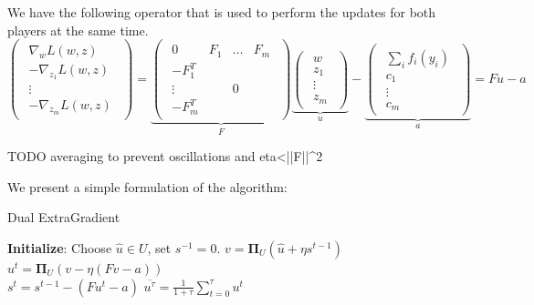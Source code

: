 We have the following operator that is used to perform the updates for
both players at the same time.
\begin{equation}
  \begin{pmatrix}
    \begin{array}{c} \nabla_{ w} {L}( w, z)\\
      -\nabla_{ z_1} {L}( w, z)\\
      \vdots\\
      -\nabla_{ z_m} {L}( w, z)
    \end{array}
  \end{pmatrix} =
  \underbrace{
    \begin{pmatrix}
      \begin{array}{cccc}
        0 &  F_1 & \dots &  F_m\\
        - F_1^T & & &\\
        \vdots & &  0 &\\
        - F_m^T & & &
      \end{array}
    \end{pmatrix}}_{ F}
  \underbrace{
    \begin{pmatrix}
      \begin{array}{c}
         w\\
         z_1\\
        \vdots\\
         z_m
      \end{array}
    \end{pmatrix}}_{ u}-
  \underbrace{
    \begin{pmatrix}
      \begin{array}{c}
        \sum_i  f_i( y_i)\\
         c_1\\
        \vdots\\
         c_m
      \end{array}
    \end{pmatrix}}_{ a} =  F  u -  a
  \end{equation}

TODO averaging to prevent oscillations and eta<||F||^2

We present a simple formulation of the algorithm:
\begin{algorithm}
  \caption{Dual ExtraGradient}
  \label{alg:extra}
\begin{algorithmic}
  \STATE \textbf{Initialize}: Choose $\hat{ u} \in {U}$, set $ s^{-1} = 0$.
  \STATE $ v = \mathbf{\Pi}_{{U}}(\hat{ u} + \eta  s^{t-1})$\\
  \STATE $ u^t = \mathbf{\Pi}_{{U}}( v - \eta ( F  v -  a))$\\
  \STATE $ s^t =   s^{t-1} - ( F  u^t -  a)$
  \ENDFOR
  \RETURN $\overline{ u^{\tau}} = \frac{1}{1 + \tau} \sum_{t=0}^{\tau}  u^t$
\end{algorithmic}
\end{algorithm}

